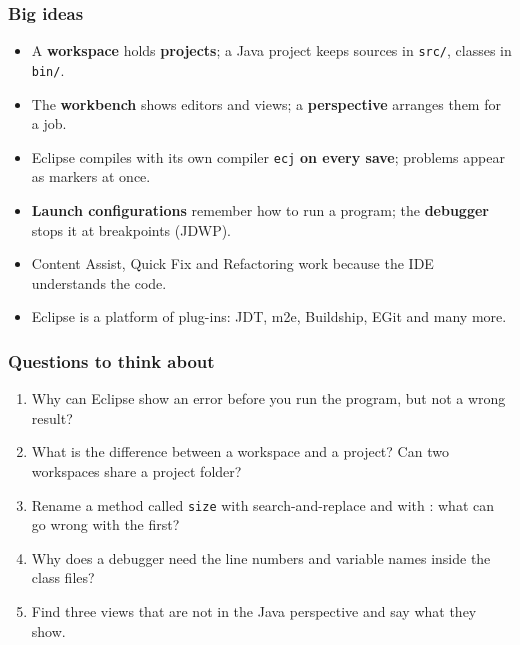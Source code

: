 \documentclass[aspectratio=169,10pt,compress]{beamer}
\begin{document}
\begin{frame}[t,fragile] \frametitle{Big ideas}
  \begin{itemize}
    \item A \textbf{workspace} holds \textbf{projects}; a Java project keeps sources in \texttt{src/}, classes in \texttt{bin/}.
    \item The \textbf{workbench} shows editors and views; a \textbf{perspective} arranges them for a job.
    \item Eclipse compiles with its own compiler \texttt{ecj} \textbf{on every save}; problems appear as markers at once.
    \item \textbf{Launch configurations} remember how to run a program; the \textbf{debugger} stops it at breakpoints (JDWP).
    \item Content Assist, Quick Fix and Refactoring work because the IDE understands the code.
    \item Eclipse is a platform of plug-ins: JDT, m2e, Buildship, EGit and many more.
  \end{itemize}
\end{frame}




\begin{frame}[t,fragile] \frametitle{Questions to think about}
  \begin{enumerate}\small
    \item Why can Eclipse show an error before you run the program, but not a wrong result?
    \item What is the difference between a workspace and a project? Can two workspaces share a project folder?
    \item Rename a method called \texttt{size} with search-and-replace and with : what can go wrong with the first?
    \item Why does a debugger need the line numbers and variable names inside the class files?
    \item Find three views that are not in the Java perspective and say what they show.
  \end{enumerate}
\end{frame}




\begin{frame}[t,fragile]
	\begin{center}
		\vspace{4cm}
	\end{center}
\end{frame}
\end{document}
